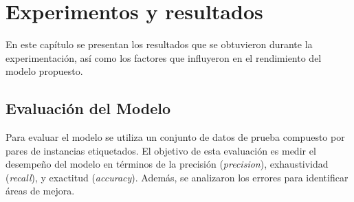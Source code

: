 \chapter{Experimentos y resultados}\label{chapter:implementation}

En este capítulo se presentan los resultados que se obtuvieron durante la experimentación, así como los factores que influyeron en el rendimiento del modelo propuesto.


\section{Evaluación del Modelo}

Para evaluar el modelo se utiliza un conjunto de datos de prueba compuesto por pares de instancias etiquetados. El objetivo de esta evaluación es medir el desempeño del modelo en términos de  la precisión (\textit{precision}), exhaustividad (\textit{recall}), y exactitud (\textit{accuracy}). Además, se analizaron los errores para identificar áreas de mejora.

